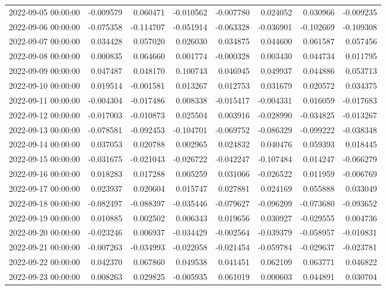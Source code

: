 \begin{tabular}{lrrrrrrr}
2022-09-05 00:00:00 & -0.009579 & 0.060471 & -0.010562 & -0.007780 & 0.024052 & 0.030966 & -0.009235 \\
2022-09-06 00:00:00 & -0.075358 & -0.114707 & -0.051914 & -0.063328 & -0.036901 & -0.102669 & -0.109308 \\
2022-09-07 00:00:00 & 0.034428 & 0.057020 & 0.026030 & 0.034875 & 0.044600 & 0.061587 & 0.057456 \\
2022-09-08 00:00:00 & 0.000835 & 0.064660 & 0.001774 & -0.000328 & 0.003430 & 0.044734 & 0.011795 \\
2022-09-09 00:00:00 & 0.047487 & 0.048170 & 0.100743 & 0.046945 & 0.049937 & 0.044886 & 0.053713 \\
2022-09-10 00:00:00 & 0.019514 & -0.001581 & 0.013267 & 0.012753 & 0.031679 & 0.020572 & 0.034375 \\
2022-09-11 00:00:00 & -0.004304 & -0.017486 & 0.008338 & -0.015417 & -0.004331 & 0.016059 & -0.017683 \\
2022-09-12 00:00:00 & -0.017003 & -0.010873 & 0.025504 & 0.003916 & -0.028990 & -0.034825 & -0.013267 \\
2022-09-13 00:00:00 & -0.078581 & -0.092453 & -0.104701 & -0.069752 & -0.086329 & -0.099222 & -0.038348 \\
2022-09-14 00:00:00 & 0.037053 & 0.020788 & 0.002965 & 0.024832 & 0.040476 & 0.059393 & 0.018445 \\
2022-09-15 00:00:00 & -0.031675 & -0.021043 & -0.026722 & -0.042247 & -0.107484 & 0.014247 & -0.066279 \\
2022-09-16 00:00:00 & 0.018283 & 0.017288 & 0.005259 & 0.031066 & -0.026522 & 0.011959 & -0.006769 \\
2022-09-17 00:00:00 & 0.023937 & 0.020604 & 0.015747 & 0.027881 & 0.024169 & 0.055888 & 0.033049 \\
2022-09-18 00:00:00 & -0.082497 & -0.088397 & -0.035446 & -0.079627 & -0.096209 & -0.073680 & -0.093652 \\
2022-09-19 00:00:00 & 0.010885 & 0.002502 & 0.006343 & 0.019656 & 0.030927 & -0.029555 & 0.004736 \\
2022-09-20 00:00:00 & -0.023246 & 0.006937 & -0.034429 & -0.002564 & -0.039379 & -0.058957 & -0.010831 \\
2022-09-21 00:00:00 & -0.007263 & -0.034993 & -0.022058 & -0.021454 & -0.059784 & -0.029637 & -0.023781 \\
2022-09-22 00:00:00 & 0.042370 & 0.067860 & 0.049538 & 0.041451 & 0.062109 & 0.063771 & 0.046822 \\
2022-09-23 00:00:00 & 0.008263 & 0.029825 & -0.005935 & 0.061019 & 0.000603 & 0.044891 & 0.030704 \\

\end{tabular}
